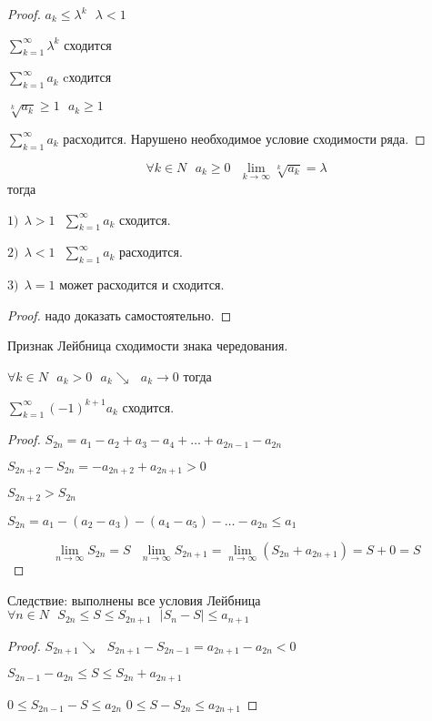 \begin{proof}
  $a_k \le \lambda^k ~~~ \lambda < 1$

  $\sum_{k=1}^{\infty} \lambda^k$ сходится

  $\sum_{k=1}^{\infty} a_k$ cходится

  $\sqrt[k]{a_k} \ge 1 ~~~ a_k \ge 1$

  $\sum_{k=1}^{\infty} a_k$ расходится. Нарушено необходимое условие сходимости
  ряда.
\end{proof}

\begin{theorem}
  $$
  \forall k \in N ~~~ a_k \ge 0 ~~~ \lim_{k \to \infty} \sqrt[k]{a_k} = \lambda
  $$
  тогда

  $1) ~~ \lambda > 1 ~~~ \sum_{k=1}^{\infty} a_k$ сходится.

  $2) ~~ \lambda < 1 ~~~ \sum_{k=1}^{\infty} a_k$ расходится.

  $3) ~~ \lambda = 1$ может расходится и сходится.
\end{theorem}

\begin{proof}
  надо доказать самостоятельно.
\end{proof}

\begin{title}[\Large]
  Признак Лейбница сходимости знака чередования.
\end{title}

\begin{theorem}
  $\forall k \in N ~~~ a_k > 0 ~~~ a_k \searrow ~~~ a_k \to 0$ тогда

  $\sum_{k=1}^{\infty} (-1)^{k+1} a_k$ сходится.
\end{theorem}

\begin{proof}
  $S_{2n} = a_1 - a_2 + a_3 - a_4 + \ldots + a_{2n-1} - a_{2n}$

  $S_{2n+2} - S_{2n} = -a_{2n+2} + a_{2n+1} > 0$

  $S_{2n+2} > S_{2n}$

  $S_{2n} = a_1 - (a_2 - a_3) - (a_4 - a_5) - \ldots - a_{2n} \le a_1$

  $$
  \lim_{n \to \infty} S_{2n} = S ~~~ \lim_{n \to \infty} S_{2n+1} =
  \lim_{n \to \infty} (S_{2n} + a_{2n+1}) = S + 0 = S
  $$
\end{proof}

Следствие: выполнены все условия Лейбница
$\forall n \in N ~~~ S_{2n} \le S \le S_{2n+1} ~~~ |S_n - S| \le a_{n+1}$

\begin{proof}
  $S_{2n+1} \searrow ~~~ S_{2n+1} - S_{2n-1} = a_{2n+1} - a_{2n} < 0$

  $S_{2n-1} - a_{2n} \le S \le S_{2n} + a_{2n+1}$

  $0 \le S_{2n-1} - S \le a_{2n}$
  $0 \le S - S_{2n} \le a_{2n+1}$
\end{proof}

